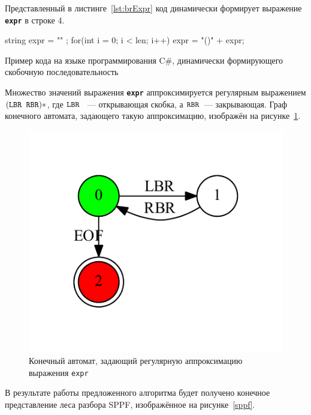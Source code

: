 Представленный в листинге~\ref{lst:brExpr} код динамически формирует выражение \textbf{\texttt{expr}} в строке 4.

\begin{listing}
\begin{pyglist}[language=csharp,numbers=left,numbersep=5pt]
 string expr = "" ;
 for(int i = 0; i < len; i++) 
 {
     expr = "()" + expr;
 }
\end{pyglist}
\caption{Пример кода на языке программирования C\#, динамически формирующего скобочную последовательность}
\label{lst:brExpr}
\end{listing}

Множество значений выражения \textbf{\texttt{expr}} аппроксимируется регулярным выражением $(\mbox{\texttt{LBR }} \mbox{\texttt{RBR}})*$, где $\mbox{\texttt{LBR }}$ --- открывающая скобка, а $\mbox{\texttt{RBR}}$~--- закрывающая. Граф конечного автомата, задающего такую аппроксимацию, изображён на рисунке~\ref{input}.

\begin{figure}[!h]
 \centering
 \includegraphics[]{pics/input.pdf}
 \caption{Конечный автомат, задающий регулярную аппроксимацию выражения \texttt{expr}}
 \label{input}
\end{figure}

В результате работы предложенного алгоритма будет получено конечное представление леса разбора SPPF, изображённое на рисунке~\ref{sppf}.

